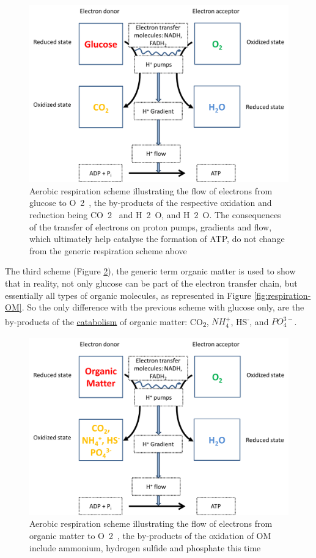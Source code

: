 \documentclass[]{book}
\theoremstyle{definition}
\theoremstyle{definition}
\theoremstyle{definition}
\theoremstyle{remark}
\begin{document}
\begin{figure}

{\centering \includegraphics[width=0.75\linewidth]{pictures/respiration-glucose-O2} 

}

\caption{Aerobic respiration scheme illustrating the flow of electrons from glucose to O~2~, the by-products of the respective oxidation and reduction being CO~2~ and H~2~O, and H~2~O. The consequences of the transfer of electrons on proton pumps, gradients and flow, which ultimately help catalyse the formation of ATP, do not change from the generic respiration scheme above}\label{fig:aerobic-resp-scheme-glucose}
\end{figure}

The third scheme (Figure \ref{fig:aerobic-resp-scheme-OM}), the generic
term organic matter is used to show that in reality, not only glucose
can be part of the electron transfer chain, but essentially all types of
organic molecules, as represented in Figure \ref{fig:respiration-OM}. So
the only difference with the previous scheme with glucose only, are the
by-products of the \protect\hyperlink{catabolism}{catabolism} of organic
matter: CO\textsubscript{2}, \(NH_4^+\), HS\textsuperscript{-}, and
\(PO_4^{3-}\).

\begin{figure}

{\centering \includegraphics[width=0.75\linewidth]{pictures/respiration-OM-O2} 

}

\caption{Aerobic respiration scheme illustrating the flow of electrons from organic matter to O~2~, the by-products of the oxidation of OM include ammonium, hydrogen sulfide and phosphate this time}\label{fig:aerobic-resp-scheme-OM}
\end{figure}
\end{document}
